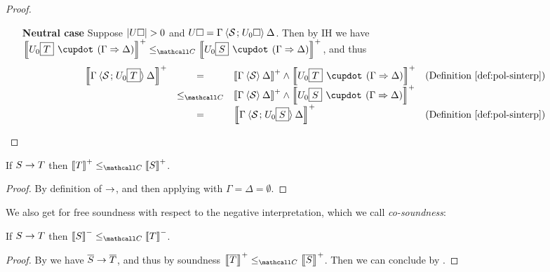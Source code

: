 \begin{proof}
\begin{itemize}
    \item[\textbf{Neutral case}] Suppose $\left|U\square\right| > 0$ and $U\square =
    \Gamma \mathbin{\langle \mathcal{S} \;\!;\!\; U_0\square \rangle} \Delta$. Then by IH we have
    $\psint{U_0\select{T} \mix (\Gamma \seq \Delta)} \sementC
    \psint{U_0\select{S} \mix (\Gamma \seq \Delta)}$, and thus
    $$
    \begin{array}{rcll}
      \psint{\Gamma \piq{\mathcal{S} \sep U_0\select{T}} \Delta}
      &=& \psint{\Gamma \piq{\mathcal{S}} \Delta} \land \psint{U_0\select{T} \mix (\Gamma \seq \Delta)} &\text{(\refdef{pol-sinterp})}\\
      &\sementC& \psint{\Gamma \piq{\mathcal{S}} \Delta} \land \psint{U_0\select{S} \mix (\Gamma \seq \Delta)} &\\
      &=& \psint{\Gamma \piq{\mathcal{S} \sep U_0\select{S}} \Delta} &\text{(\refdef{pol-sinterp})}
    \end{array}
    $$
  \end{itemize}
\end{proof}

\begin{theorem}[Soundness]
  If $S \rightarrow T$ then $\psint{T} \sementC \psint{S}$.
\end{theorem}
\begin{proof}
  By definition of $\rightarrow$, and then applying 
  with $\Gamma = \Delta = \emptyset$.
\end{proof}

We also get for free soundness with respect to the negative interpretation,
which we call \emph{co-soundness}:

\begin{theorem}[Co-soundness]
  If $S \rightarrow T$ then $\nsint{S} \sementC \nsint{T}$.
\end{theorem}
\begin{proof}
  By  we have $\overline{S} \rightarrow \overline{T}$,
  and thus by soundness $\psint{\soldual{T}} \sementC \psint{\soldual{S}}$. Then
  we can conclude by .
\end{proof}

